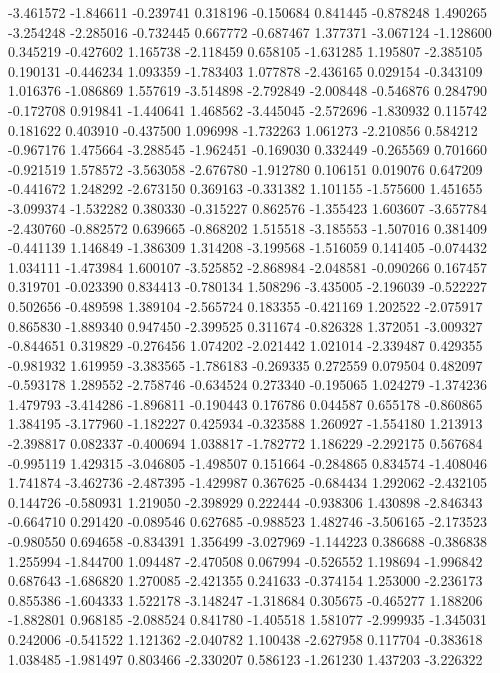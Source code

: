 -3.461572
-1.846611
-0.239741
0.318196
-0.150684
0.841445
-0.878248
1.490265
-3.254248
-2.285016
-0.732445
0.667772
-0.687467
1.377371
-3.067124
-1.128600
0.345219
-0.427602
1.165738
-2.118459
0.658105
-1.631285
1.195807
-2.385105
0.190131
-0.446234
1.093359
-1.783403
1.077878
-2.436165
0.029154
-0.343109
1.016376
-1.086869
1.557619
-3.514898
-2.792849
-2.008448
-0.546876
0.284790
-0.172708
0.919841
-1.440641
1.468562
-3.445045
-2.572696
-1.830932
0.115742
0.181622
0.403910
-0.437500
1.096998
-1.732263
1.061273
-2.210856
0.584212
-0.967176
1.475664
-3.288545
-1.962451
-0.169030
0.332449
-0.265569
0.701660
-0.921519
1.578572
-3.563058
-2.676780
-1.912780
0.106151
0.019076
0.647209
-0.441672
1.248292
-2.673150
0.369163
-0.331382
1.101155
-1.575600
1.451655
-3.099374
-1.532282
0.380330
-0.315227
0.862576
-1.355423
1.603607
-3.657784
-2.430760
-0.882572
0.639665
-0.868202
1.515518
-3.185553
-1.507016
0.381409
-0.441139
1.146849
-1.386309
1.314208
-3.199568
-1.516059
0.141405
-0.074432
1.034111
-1.473984
1.600107
-3.525852
-2.868984
-2.048581
-0.090266
0.167457
0.319701
-0.023390
0.834413
-0.780134
1.508296
-3.435005
-2.196039
-0.522227
0.502656
-0.489598
1.389104
-2.565724
0.183355
-0.421169
1.202522
-2.075917
0.865830
-1.889340
0.947450
-2.399525
0.311674
-0.826328
1.372051
-3.009327
-0.844651
0.319829
-0.276456
1.074202
-2.021442
1.021014
-2.339487
0.429355
-0.981932
1.619959
-3.383565
-1.786183
-0.269335
0.272559
0.079504
0.482097
-0.593178
1.289552
-2.758746
-0.634524
0.273340
-0.195065
1.024279
-1.374236
1.479793
-3.414286
-1.896811
-0.190443
0.176786
0.044587
0.655178
-0.860865
1.384195
-3.177960
-1.182227
0.425934
-0.323588
1.260927
-1.554180
1.213913
-2.398817
0.082337
-0.400694
1.038817
-1.782772
1.186229
-2.292175
0.567684
-0.995119
1.429315
-3.046805
-1.498507
0.151664
-0.284865
0.834574
-1.408046
1.741874
-3.462736
-2.487395
-1.429987
0.367625
-0.684434
1.292062
-2.432105
0.144726
-0.580931
1.219050
-2.398929
0.222444
-0.938306
1.430898
-2.846343
-0.664710
0.291420
-0.089546
0.627685
-0.988523
1.482746
-3.506165
-2.173523
-0.980550
0.694658
-0.834391
1.356499
-3.027969
-1.144223
0.386688
-0.386838
1.255994
-1.844700
1.094487
-2.470508
0.067994
-0.526552
1.198694
-1.996842
0.687643
-1.686820
1.270085
-2.421355
0.241633
-0.374154
1.253000
-2.236173
0.855386
-1.604333
1.522178
-3.148247
-1.318684
0.305675
-0.465277
1.188206
-1.882801
0.968185
-2.088524
0.841780
-1.405518
1.581077
-2.999935
-1.345031
0.242006
-0.541522
1.121362
-2.040782
1.100438
-2.627958
0.117704
-0.383618
1.038485
-1.981497
0.803466
-2.330207
0.586123
-1.261230
1.437203
-3.226322
